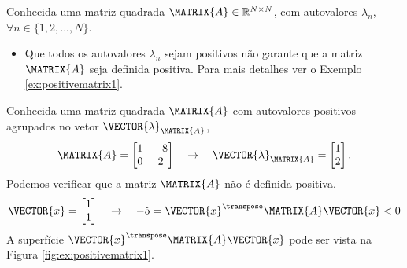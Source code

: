 \begin{tcbattention}
Conhecida uma matriz quadrada $\MATRIX{A} \in \mathbb{R}^{N \times N}$, 
com  autovalores $\lambda_n$, $\forall n \in \{1, 2, ..., N\}$.
\begin{itemize}
\item Que todos os autovalores $\lambda_n$ sejam positivos não garante que a matriz $\MATRIX{A}$
seja definida positiva. Para mais detalhes ver o Exemplo \ref{ex:positivematrix1}.
\end{itemize}
\end{tcbattention}

\noindent
\begin{minipage}{0.5\textwidth}
\begin{example}
\label{ex:positivematrix1}
Conhecida uma matriz quadrada $\MATRIX{A}$ com autovalores positivos agrupados no vetor $\VECTOR{\lambda}_{\MATRIX{A}}$, 
\begin{equation}
\MATRIX{A}=
\begin{bmatrix}
1 & -8\\
0 & 2
\end{bmatrix}
\quad \rightarrow \quad 
\VECTOR{\lambda}_{\MATRIX{A}}=
\begin{bmatrix}
1 \\
2
\end{bmatrix}.
\end{equation}
Podemos verificar que a matriz $\MATRIX{A}$ não é definida positiva.
\begin{equation}
\VECTOR{x}=
\begin{bmatrix}
1 \\
1
\end{bmatrix}
\quad \rightarrow \quad 
-5 = \VECTOR{x}^{\transpose}\MATRIX{A}\VECTOR{x}<0
\end{equation}
A superfície $\VECTOR{x}^{\transpose}\MATRIX{A}\VECTOR{x}$ 
pode ser vista na Figura \ref{fig:ex:positivematrix1}.
\end{example}
\end{minipage}
